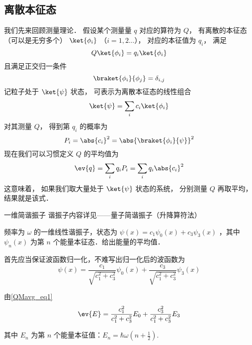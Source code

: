 

\subsection{离散本征态}

我们先来回顾测量理论． 假设某个测量量 $q$ 对应的算符为 $Q$， 有离散的本征态（可以是无穷多个） $\ket{\phi_i}$ （$i = 1,2\dots$）， 对应的本征值为 $q_i$， 满足
\begin{equation}\label{QMavg_eq3}
Q\ket{\phi_i} = q_i \ket{\phi_i}
\end{equation}
且满足正交归一条件
\begin{equation}\label{QMavg_eq4}
\braket{\phi_i}{\phi_j} = \delta_{i,j}
\end{equation}
记粒子处于 $\ket{\psi}$ 状态， 可表示为离散本征态的线性组合
\begin{equation}\label{QMavg_eq2}
\ket{\psi} = \sum_i c_i \ket{\phi_i}
\end{equation}
对其测量 $Q$， 得到第 $q_i$ 的概率为
\begin{equation}
P_i = \abs{c_i}^2 = \abs{\braket{\phi_i}{\psi}}^2
\end{equation}
现在我们可以习惯定义 $Q$ 的平均值为
\begin{equation}\label{QMavg_eq1}
\ev{q} = \sum_i q_i P_i = \sum_i q_i \abs{c_i}^2
\end{equation}
这意味着， 如果我们取大量处于 $\ket{\psi}$ 状态的系统， 分别测量 $Q$ 再取平均， 结果就是该式．

\begin{example}{一维简谐振子}
谐振子内容详见——量子简谐振子（升降算符法）

频率为 $\omega$ 的一维线性谐振子，状态为 $\psi(x)=c_1 \psi_0(x)+c_3\psi_3(x)$ ，其中 $\psi_n(x)$ 为第 $n$ 个能量本征态．给出能量的平均值．

首先应当保证波函数归一化，不难写出归一化后的波函数为
\begin{equation}
\psi(x)=\frac{c_1}{\sqrt{c_1^2+c_3^2}}\psi_0(x)+\frac{c_3}{\sqrt{c_1^2+c_3^2}}\psi_3(x)
\end{equation}

由\autoref{QMavg_eq1}
\begin{equation}
\ev{E}=\frac{c_1^2}{c_1^2+c_3^2} E_0+\frac{c_3^2}{c_1^2+c_3^2} E_3
\end{equation}

其中 $E_n$ 为第 $n$ 个能量本征值：$E_n=\hbar \omega(n+\frac{1}{2})$.
\end{example}


